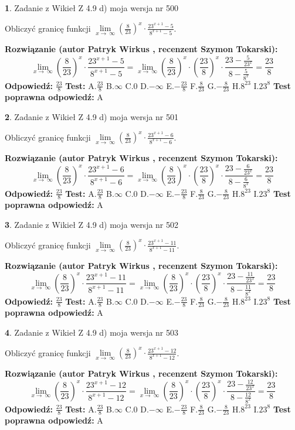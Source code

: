 \documentclass[12pt, a4paper]{article}
\theoremstyle{definition} %
\newtheorem{zad}{}
\newcommand{\zadStart}[1]{\begin{zad}#1\newline}
\newcommand{\zadStop}{\end{zad}}
\newcommand{\rozwStart}[2]{\noindent \textbf{Rozwiązanie (autor #1 , recenzent #2): }\newline}
\newcommand{\rozwStop}{\newline}
\newcommand{\odpStart}{\noindent \textbf{Odpowiedź:}\newline}
\newcommand{\odpStop}{\newline}
\newcommand{\testStart}{\noindent \textbf{Test:}\newline}
\newcommand{\testStop}{\newline}
\newcommand{\kluczStart}{\noindent \textbf{Test poprawna odpowiedź:}\newline}
\newcommand{\kluczStop}{\newline}
\begin{document}
\zadStart{Zadanie z Wikieł Z 4.9 d) moja wersja nr 500}


Obliczyć granicę funkcji  $\lim\limits_{x\to\ \infty}(\frac{8}{23})^{x}\cdot\frac{23^{x+1}-5}{8^{x+1}-5}$.
\zadStop
\rozwStart{Patryk Wirkus}{Szymon Tokarski}
$$\lim\limits_{x\to\ \infty}(\frac{8}{23})^{x}\cdot\frac{23^{x+1}-5}{8^{x+1}-5}=\lim\limits_{x\to\ \infty}(\frac{8}{23})^{x}\cdot(\frac{23}{8})^{x} \cdot \frac{23-\frac{5}{23^{x}}}{8-\frac{5}{8^{x}}} = \frac{23}{8}$$
\rozwStop
\odpStart
$\frac{23}{8}$
\odpStop
\testStart
A.$\frac{23}{8}$ B.$\infty$ C.$0$ D.$-\infty$ E.$-\frac{23}{8}$
F.$\frac{8}{23}$ G.$-\frac{8}{23}$
H.$8^{23}$
I.$23^{8}$
\testStop
\kluczStart
A
\kluczStop



\zadStart{Zadanie z Wikieł Z 4.9 d) moja wersja nr 501}


Obliczyć granicę funkcji  $\lim\limits_{x\to\ \infty}(\frac{8}{23})^{x}\cdot\frac{23^{x+1}-6}{8^{x+1}-6}$.
\zadStop
\rozwStart{Patryk Wirkus}{Szymon Tokarski}
$$\lim\limits_{x\to\ \infty}(\frac{8}{23})^{x}\cdot\frac{23^{x+1}-6}{8^{x+1}-6}=\lim\limits_{x\to\ \infty}(\frac{8}{23})^{x}\cdot(\frac{23}{8})^{x} \cdot \frac{23-\frac{6}{23^{x}}}{8-\frac{6}{8^{x}}} = \frac{23}{8}$$
\rozwStop
\odpStart
$\frac{23}{8}$
\odpStop
\testStart
A.$\frac{23}{8}$ B.$\infty$ C.$0$ D.$-\infty$ E.$-\frac{23}{8}$
F.$\frac{8}{23}$ G.$-\frac{8}{23}$
H.$8^{23}$
I.$23^{8}$
\testStop
\kluczStart
A
\kluczStop



\zadStart{Zadanie z Wikieł Z 4.9 d) moja wersja nr 502}


Obliczyć granicę funkcji  $\lim\limits_{x\to\ \infty}(\frac{8}{23})^{x}\cdot\frac{23^{x+1}-11}{8^{x+1}-11}$.
\zadStop
\rozwStart{Patryk Wirkus}{Szymon Tokarski}
$$\lim\limits_{x\to\ \infty}(\frac{8}{23})^{x}\cdot\frac{23^{x+1}-11}{8^{x+1}-11}=\lim\limits_{x\to\ \infty}(\frac{8}{23})^{x}\cdot(\frac{23}{8})^{x} \cdot \frac{23-\frac{11}{23^{x}}}{8-\frac{11}{8^{x}}} = \frac{23}{8}$$
\rozwStop
\odpStart
$\frac{23}{8}$
\odpStop
\testStart
A.$\frac{23}{8}$ B.$\infty$ C.$0$ D.$-\infty$ E.$-\frac{23}{8}$
F.$\frac{8}{23}$ G.$-\frac{8}{23}$
H.$8^{23}$
I.$23^{8}$
\testStop
\kluczStart
A
\kluczStop



\zadStart{Zadanie z Wikieł Z 4.9 d) moja wersja nr 503}


Obliczyć granicę funkcji  $\lim\limits_{x\to\ \infty}(\frac{8}{23})^{x}\cdot\frac{23^{x+1}-12}{8^{x+1}-12}$.
\zadStop
\rozwStart{Patryk Wirkus}{Szymon Tokarski}
$$\lim\limits_{x\to\ \infty}(\frac{8}{23})^{x}\cdot\frac{23^{x+1}-12}{8^{x+1}-12}=\lim\limits_{x\to\ \infty}(\frac{8}{23})^{x}\cdot(\frac{23}{8})^{x} \cdot \frac{23-\frac{12}{23^{x}}}{8-\frac{12}{8^{x}}} = \frac{23}{8}$$
\rozwStop
\odpStart
$\frac{23}{8}$
\odpStop
\testStart
A.$\frac{23}{8}$ B.$\infty$ C.$0$ D.$-\infty$ E.$-\frac{23}{8}$
F.$\frac{8}{23}$ G.$-\frac{8}{23}$
H.$8^{23}$
I.$23^{8}$
\testStop
\kluczStart
A
\kluczStop
\end{document}
